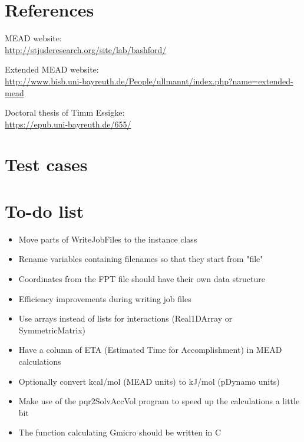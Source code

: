 \documentclass[a4paper,11pt]{article}
\begin{document}
\section{References}
MEAD website: \\
\url{http://stjuderesearch.org/site/lab/bashford/}

Extended MEAD website:\\ 
\url{http://www.bisb.uni-bayreuth.de/People/ullmannt/index.php?name=extended-mead}

Doctoral thesis of Timm Essigke:\\
\url{https://epub.uni-bayreuth.de/655/}


\section{Test cases}


\section{To-do list}
\begin{itemize}
  \setlength{\itemsep}{2pt}
  \item Move parts of WriteJobFiles to the instance class
  \item Rename variables containing filenames so that they start from "file"
  \item Coordinates from the FPT file should have their own data structure
  \item Efficiency improvements during writing job files
  \item Use arrays instead of lists for interactions (Real1DArray or SymmetricMatrix)
  \item Have a column of ETA (Estimated Time for Accomplishment) in MEAD calculations
  \item Optionally convert kcal/mol (MEAD units) to kJ/mol (pDynamo units)
  \item Make use of the pqr2SolvAccVol program to speed up the calculations a little bit
  \item The function calculating Gmicro should be written in C
\end{itemize}
\end{document}
